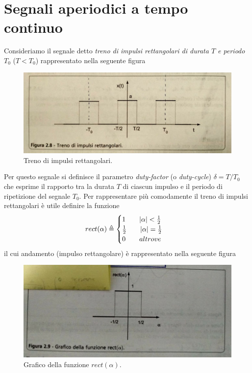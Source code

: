\documentclass[12pt,oneside,openany]{memoir}
\numberwithin{equation}{subsection}
\DeclarePairedDelimiter{\abs}{\lvert}{\rvert}
\begin{document}
\section{Segnali aperiodici a tempo continuo}
Consideriamo il segnale detto \textit{treno di impulsi rettangolari di durata $T$ e periodo $T_0$} ($T < T_0$) rappresentato nella seguente figura
\begin{figure}[H]
\centering
\captionsetup{justification=centering}
\includegraphics[width=1.0\textwidth]{images/treno_di_impulsi_rettangolari.jpg}
\caption{Treno di impulsi rettangolari.}
\end{figure}
Per questo segnale si definisce il parametro \textit{duty-factor} (o \textit{duty-cycle}) $\delta = T/T_0$ che esprime il rapporto tra la durata $T$ di ciascun impulso e il periodo di ripetizione del segnale $T_0$.
\bigbreak
Per rappresentare pi\`u comodamente il treno di impulsi rettangolari \`e utile definire la funzione
\begin{equation}
	rect(\alpha) \triangleq
		\begin{cases}
			1 \quad\quad \abs{\alpha} < \frac{1}{2}\\
			\frac{1}{2} \quad\quad \abs{\alpha} = \frac{1}{2}\\
			0 \quad\quad altrove
		\end{cases}
\end{equation}
il cui andamento (impulso rettangolare) \`e rappresentato nella seguente figura
\begin{figure}[H]
\centering
\captionsetup{justification=centering}
\includegraphics[width=1.0\textwidth]{images/rect_alpha.jpg}
\caption{Grafico della funzione $rect(\alpha)$.}
\end{figure}
\end{document}
